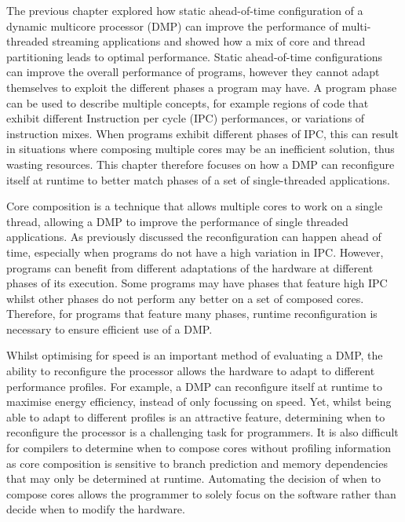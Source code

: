 The previous chapter explored how static ahead-of-time configuration of a dynamic multicore processor (DMP) can improve the performance of multi-threaded streaming applications and showed how a mix of core and thread partitioning leads to optimal performance.
Static ahead-of-time configurations can improve the overall performance of programs, however they cannot adapt themselves to exploit the different phases a program may have.
A program phase can be used to describe multiple concepts, for example regions of code that exhibit different Instruction per cycle (IPC) performances, or variations of instruction mixes.
When programs exhibit different phases of IPC, this can result in situations where composing multiple cores may be an inefficient solution, thus wasting resources.
This chapter therefore focuses on how a DMP can reconfigure itself at runtime to better match phases of a set of single-threaded applications.

Core composition is a technique that allows multiple cores to work on a single thread, allowing a DMP to improve the performance of single threaded applications.
As previously discussed the reconfiguration can happen ahead of time, especially when programs do not have a high variation in IPC.
However, programs can benefit from different adaptations of the hardware at different phases of its execution.
Some programs may have phases that feature high IPC whilst other phases do not perform any better on a set of composed cores.
Therefore, for programs that feature many phases, runtime reconfiguration is necessary to ensure efficient use of a DMP.

Whilst optimising for speed is an important method of evaluating a DMP, the ability to reconfigure the processor allows the hardware to adapt to different performance profiles.
For example, a DMP can reconfigure itself at runtime to maximise energy efficiency, instead of only focussing on speed.
Yet, whilst being able to adapt to different profiles is an attractive feature, determining when to reconfigure the processor is a challenging task for programmers.
It is also difficult for compilers to determine when to compose cores without profiling information as core composition is sensitive to branch prediction and memory dependencies that may only be determined at runtime.%
Automating the decision of when to compose cores allows the programmer to solely focus on the software rather than decide when to modify the hardware.

